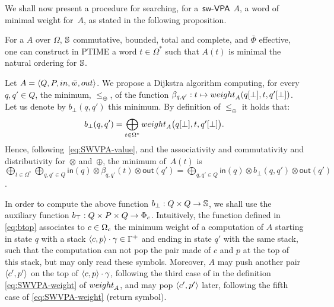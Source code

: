 \label{sec:best}\label{sec:search}
\noindent
We shall now present a procedure for searching, for a~$\textsf{sw-VPA}$ $A$,
a word %
of minimal weight for~$A$,
as stated in the following proposition. %
%
\begin{proposition}\label{th:best-search}
For a \SWVPA $A$
over $\Omega$,
$\mathbb{S}$ commutative, bounded, total and complete, %
and $\bar\Phi$ effective, %
one can construct in PTIME a word $t \in \Omega^*$
such that $A(t)$ is minimal \wrt the natural ordering for $\mathbb{S}$.
\end{proposition}
%
Let $A = \< Q, P, \init, \bar\wei, \final >$.
%
We propose a Dijkstra algorithm computing,
for every $q, q' \in Q$,
the minimum, \wrt $\leq_\oplus$, of the function
$\beta_{q, q'} : t \mapsto \weight_A(\config{q}{\bot}, t, \config{q'}{\bot})$.
Let us denote by $b_\bot(q, q')$ this minimum.
By definition of $\leq_\oplus$ it holds that:
%
\begin{equation}\label{eq:bbot}
  b_\bot(q, q') = \bigoplus_{t\in \Omega^*}
  \textstyle
  \weight_A\bigl(\config{q}{\bot}, t, \config{q'}{\bot}\bigr).
\end{equation}
Hence, following~\eqref{eq:SWVPA-value}, and the associativity and commutativity
and distributivity for~$\otimes$ and~$\oplus$, the minimum of~$A(t)$ is
\(
{\displaystyle\bigoplus_{t\in \Omega^*}}
{\displaystyle\bigoplus_{q, q' \in Q}} \textstyle
\mathsf{in}(q) \mathop{\otimes}
\beta_{q, q'}(t)
\mathop{\otimes} \mathsf{out}(q')
=
{\displaystyle\bigoplus_{q, q' \in Q}} \textstyle
\mathsf{in}(q) \mathop{\otimes}
b_\bot(q, q')
\mathop{\otimes} \mathsf{out}(q')
\).

\noindent
In order to compute the above function $b_\bot : Q \times Q \to \mathbb{S}$, 
we shall use the auxiliary function $b_\top :  Q \times P \times Q \to \Phic$.
%
Intuitively, the function defined in \eqref{eq:btop}
associates to $c \in \Omegac$ 
the minimum weight of a computation of $A$
starting in state $q$ with a stack 
$\<c, p> \cdot \gamma \in \Gamma^+$ 
and ending in state $q'$ with the same stack,
such that the computation can not pop 
the pair made of $c$ and $p$ at the top of this stack,
but may only read these symbols.
Moreover, $A$ may push another pair $\< c', p'>$ %
on the top of $\<c, p> \cdot \gamma$,
following the third case of 
in the definition \eqref{eq:SWVPA-weight} of $\weight_A$,
and may pop $\< c', p'>$ later, following the fifth case of \eqref{eq:SWVPA-weight} (return symbol). 



